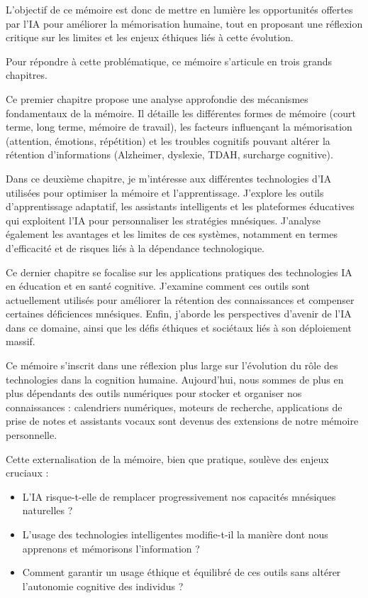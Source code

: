 \documentclass[12pt,a4paper]{report}
\begin{document}
L’objectif de ce mémoire est donc de mettre en lumière les opportunités offertes par l’IA pour améliorer la mémorisation humaine, tout en proposant une réflexion critique sur les limites et les enjeux éthiques liés à cette évolution.

Pour répondre à cette problématique, ce mémoire s’articule en trois grands chapitres.

Ce premier chapitre propose une analyse approfondie des mécanismes fondamentaux de la mémoire. Il détaille les différentes formes de mémoire (court terme, long terme, mémoire de travail), les facteurs influençant la mémorisation (attention, émotions, répétition) et les troubles cognitifs pouvant altérer la rétention d’informations (Alzheimer, dyslexie, TDAH, surcharge cognitive).

Dans ce deuxième chapitre, je m'intéresse aux différentes technologies d’IA utilisées pour optimiser la mémoire et l’apprentissage. J'explore les outils d’apprentissage adaptatif, les assistants intelligents et les plateformes éducatives qui exploitent l’IA pour personnaliser les stratégies mnésiques. J'analyse également les avantages et les limites de ces systèmes, notamment en termes d’efficacité et de risques liés à la dépendance technologique.

Ce dernier chapitre se focalise sur les applications pratiques des technologies IA en éducation et en santé cognitive. J'examine comment ces outils sont actuellement utilisés pour améliorer la rétention des connaissances et compenser certaines déficiences mnésiques. Enfin, j'aborde les perspectives d’avenir de l’IA dans ce domaine, ainsi que les défis éthiques et sociétaux liés à son déploiement massif.

Ce mémoire s’inscrit dans une réflexion plus large sur l’évolution du rôle des technologies dans la cognition humaine. Aujourd’hui, nous sommes de plus en plus dépendants des outils numériques pour stocker et organiser nos connaissances : calendriers numériques, moteurs de recherche, applications de prise de notes et assistants vocaux sont devenus des extensions de notre mémoire personnelle.

Cette externalisation de la mémoire, bien que pratique, soulève des enjeux cruciaux :
\begin{itemize}

    \item L’IA risque-t-elle de remplacer progressivement nos capacités mnésiques naturelles ?
    
    \item L’usage des technologies intelligentes modifie-t-il la manière dont nous apprenons et mémorisons l’information ?

    \item Comment garantir un usage éthique et équilibré de ces outils sans altérer l’autonomie cognitive des individus ?

\end{itemize}
\end{document}
